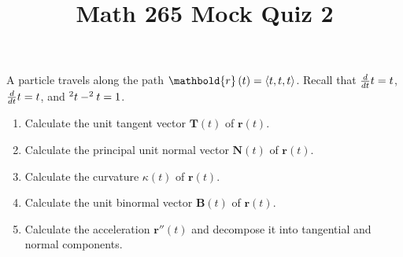 \documentclass[12pt]{article}
\title{Math 265 Mock Quiz 2}\author{}\date{}
\let\cosh\relax\DeclareMathOperator{\cosh}{\mathsf{cosh}}
\let\sinh\relax\DeclareMathOperator{\sinh}{\mathsf{sinh}}
\begin{document}
\maketitle
\thispagestyle{empty}
A particle travels along the path
$\mathbold{r}\left(t\right)=\left\langle
t,\cosh{t},\sinh{t}\right\rangle$.
Recall that $\frac{d}{dt}\cosh{t}=\sinh{t}$,
$\frac{d}{dt}\sinh{t}=\cosh{t}$,
and $\cosh^2{t}-\sinh^2{t}=1$.
\begin{enumerate}
\item Calculate the unit tangent vector
$\mathbold{T}\left(t\right)$ of $\mathbold{r}\left(t\right)$.
\vspace{3cm}
\item Calculate the principal unit normal vector
$\mathbold{N}\left(t\right)$ of $\mathbold{r}\left(t\right)$.
\vspace{3cm}
\item Calculate the curvature $\kappa\left(t\right)$
of $\mathbold{r}\left(t\right)$.
\vspace{3cm}
\item Calculate the unit binormal vector
$\mathbold{B}\left(t\right)$ of $\mathbold{r}\left(t\right)$.
\vspace{3cm}
\item Calculate the acceleration $\mathbold{r}''\left(t\right)$
and decompose it into tangential and normal components.
\end{enumerate}
\end{document}
